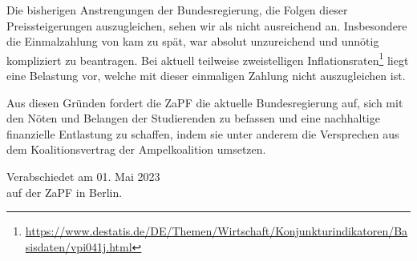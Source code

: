 \documentclass[DIV=calc]{scrartcl}
\begin{document}
Die bisherigen Anstrengungen der Bundesregierung, die Folgen dieser Preis\-stei\-ge\-run\-gen auszugleichen, sehen wir als nicht ausreichend an. Insbesondere die Einmalzahlung von  kam zu spät, war absolut unzureichend und unnötig kompliziert zu beantragen. Bei aktuell teilweise zweistelligen Inflationsraten\footnote{\url{https://www.destatis.de/DE/Themen/Wirtschaft/Konjunkturindikatoren/Basisdaten/vpi041j.html}}
liegt eine Belastung vor, welche mit dieser einmaligen Zahlung nicht auszugleichen ist.


Aus diesen Gründen fordert die ZaPF die aktuelle Bundesregierung auf, sich mit den Nöten und Belangen der Studierenden zu befassen und eine nachhaltige finanzielle Entlastung zu schaffen, indem sie unter anderem die Versprechen aus dem Koalitionsvertrag der Ampelkoalition umsetzen.



\vspace{1cm} 

\vfill
\begin{flushright}
	Verabschiedet am 01. Mai 2023 \\
	auf der ZaPF in Berlin.
\end{flushright}
\end{document}

